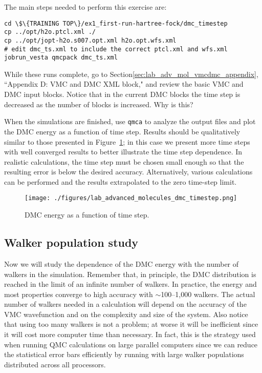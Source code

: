 The main steps needed to perform this exercise are:
\begin{lstlisting}[style=SHELL]
cd \$\{TRAINING TOP\}/ex1_first-run-hartree-fock/dmc_timestep
cp ../opt/h2o.ptcl.xml ./
cp ../opt/jopt-h2o.s007.opt.xml h2o.opt.wfs.xml
# edit dmc_ts.xml to include the correct ptcl.xml and wfs.xml
jobrun_vesta qmcpack dmc_ts.xml
\end{lstlisting}
While these runs complete, go to Section\ref{sec:lab_adv_mol_vmcdmc_appendix}, ``Appendix D: VMC and DMC XML block," and review the basic VMC and DMC input
blocks. Notice that in the current DMC blocks the time step is decreased as the number of blocks is increased. Why is this?

When the simulations are finished, use \texttt{qmca} to analyze the output files and plot the
DMC energy as a function of time step. Results should be qualitatively similar to those
presented in Figure~\ref{fig:lam_dmc_timestep}; in this case we present more time steps with well converged results to
better illustrate the time step dependence. In realistic calculations, the time step must be
chosen small enough so that the resulting error is below the desired accuracy. Alternatively,
various calculations can be performed and the results extrapolated to the zero time-step
limit.


\begin{figure}
\begin{center}
\texttt{[image: ./figures/lab\_advanced\_molecules\_dmc\_timestep.png]}
\end{center}
\caption{DMC energy as a function of time step.}
\label{fig:lam_dmc_timestep}
\end{figure}


\subsection{Walker population study}
Now we will study the dependence of the DMC energy with the number of walkers in the
simulation. Remember that, in principle, the DMC distribution is reached in the limit of
an infinite number of walkers. In practice, the energy and most properties converge to high
accuracy with $\sim$100--1,000 walkers. The actual number of walkers needed in a calculation
will depend on the accuracy of the VMC wavefunction and on the complexity and size of
the system. Also notice that using too many walkers is not a problem; at worse it will be
inefficient since it will cost more computer time than necessary. In fact, this is the strategy
used when running QMC calculations on large parallel computers since we can reduce the
statistical error bars efficiently by running with large walker populations distributed across
all processors.


